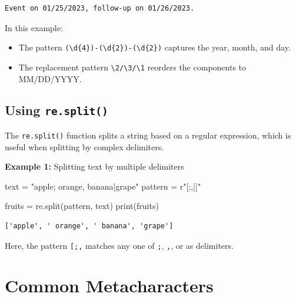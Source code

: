 \documentclass[
  letterpaper,
  DIV=11,
  numbers=noendperiod]{scrreprt}
\newenvironment{Shaded}{\begin{snugshade}}{\end{snugshade}}
\newcommand{\BuiltInTok}[1]{\textcolor[rgb]{0.00,0.23,0.31}{#1}}
\newcommand{\NormalTok}[1]{\textcolor[rgb]{0.00,0.23,0.31}{#1}}
\newcommand{\OperatorTok}[1]{\textcolor[rgb]{0.37,0.37,0.37}{#1}}
\newcommand{\StringTok}[1]{\textcolor[rgb]{0.13,0.47,0.30}{#1}}
\newcommand{\VerbatimStringTok}[1]{\textcolor[rgb]{0.13,0.47,0.30}{#1}}
\providecommand{\tightlist}{%
  \setlength{\itemsep}{0pt}\setlength{\parskip}{0pt}}\usepackage{longtable,booktabs,array}
\begin{document}
\begin{verbatim}
Event on 01/25/2023, follow-up on 01/26/2023.
\end{verbatim}

In this example:

\begin{itemize}
\tightlist
\item
  The pattern
  \texttt{(\textbackslash{}d\{4\})-(\textbackslash{}d\{2\})-(\textbackslash{}d\{2\})}
  captures the year, month, and day.
\item
  The replacement pattern
  \texttt{\textbackslash{}2/\textbackslash{}3/\textbackslash{}1}
  reorders the components to MM/DD/YYYY.
\end{itemize}

\hypertarget{using-re.split}{%
\subsection{\texorpdfstring{Using
\texttt{re.split()}}{Using re.split()}}\label{using-re.split}}

The \texttt{re.split()} function splits a string based on a regular
expression, which is useful when splitting by complex delimiters.

\textbf{Example 1:} Splitting text by multiple delimiters

\begin{Shaded}
\begin{Highlighting}[]
\NormalTok{text }\OperatorTok{=} \StringTok{"apple; orange, banana|grape"}
\NormalTok{pattern }\OperatorTok{=} \VerbatimStringTok{r"[;,|]"}

\NormalTok{fruits }\OperatorTok{=}\NormalTok{ re.split(pattern, text)}
\BuiltInTok{print}\NormalTok{(fruits)  }
\end{Highlighting}
\end{Shaded}

\begin{verbatim}
['apple', ' orange', ' banana', 'grape']
\end{verbatim}

Here, the pattern \texttt{{[};,\textbar{}{]}} matches any one of
\texttt{;}, \texttt{,}, or \texttt{\textbar{}} as delimiters.

\hypertarget{common-metacharacters}{%
\section{Common Metacharacters}\label{common-metacharacters}}
\end{document}
